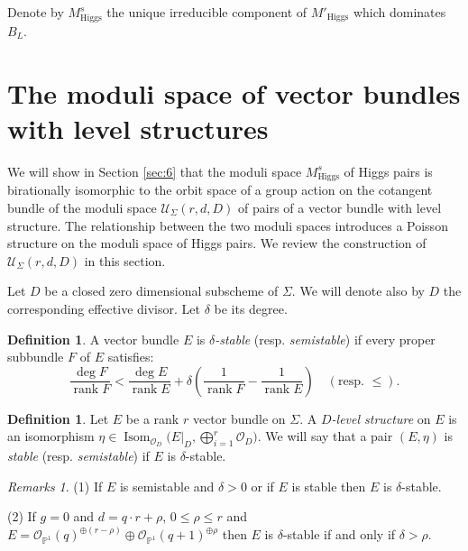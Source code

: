 \documentclass[12pt,a4paper,oneside,english]{smfart}
\theoremstyle{definition}
\newtheorem{defn}[thm]{Definition}
\theoremstyle{remark}
\newtheorem{rems}[thm]{Remarks}
\DeclareMathOperator{\Isom}{Isom}
\DeclareMathOperator{\rank}{rank}
\newcommand{\Hig}{\mathrm{Higgs}}
\newcommand{\MHp}{M'_{\Hig}}
\newcommand{\MHs}{M^{s}_{\Hig}}
\newcommand{\cU}{\mathcal{U}}
\newcommand{\cO}{\mathcal{O}}
\begin{document}
Denote by $\MHs$ the unique irreducible component of $\MHp$ which dominates $B_L$.

\section{The moduli space of vector bundles with level structures}\label{sec:4}

We will show in Section \ref{sec:6} that the moduli space $\MHs$ of Higgs pairs is birationally isomorphic to the orbit space of a group action on the cotangent bundle of the moduli space $\cU_\Sigma(r, d, D)$ of pairs of a vector bundle with level structure. The relationship between the two moduli spaces introduces a Poisson structure on the moduli space of Higgs pairs. We review the construction of $\cU_\Sigma(r, d, D)$ in this section.

Let $D$ be a closed zero dimensional subscheme of $\Sigma$. We will denote also by $D$ the corresponding effective divisor. Let $\delta$ be its degree.

\begin{defn}\label{t4.1}
A vector bundle $E$ is \emph{$\delta$-stable} (resp. \emph{semistable}) if every proper subbundle $F$ of $E$ satisfies:
\[
\frac{\deg F}{\rank F} < \frac{\deg E}{\rank E} + \delta \left( \frac{1}{\rank F} - \frac{1}{\rank E} \right) \quad (\text{resp. } \leqslant).
\]
\end{defn}

\begin{defn}\label{t4.2}
Let $E$ be a rank $r$ vector bundle on $\Sigma$. A \emph{$D$-level structure} on $E$ is an isomorphism $\eta \in \Isom_{\cO_D}\bigl(E|_D, \bigoplus_{i=1}^{r} \cO_D\bigr)$. We will say that a pair $(E, \eta)$ is \emph{stable} (resp. \emph{semistable}) if $E$ is $\delta$-stable.
\end{defn}

\begin{rems}\label{t4.3}
(1) If $E$ is semistable and $\delta > 0$ or if $E$ is stable then $E$ is $\delta$-stable.

(2) If $g = 0$ and $d = q \cdot r + \rho$, $0 \leqslant \rho \leqslant r$ and $E = \cO_{\mathbb{P}^1}(q)^{\oplus (r-\rho)} \oplus \cO_{\mathbb{P}^1}(q+1)^{\oplus \rho}$ then $E$ is $\delta$-stable if and only if $\delta > \rho$.
\end{rems}
\end{document}
